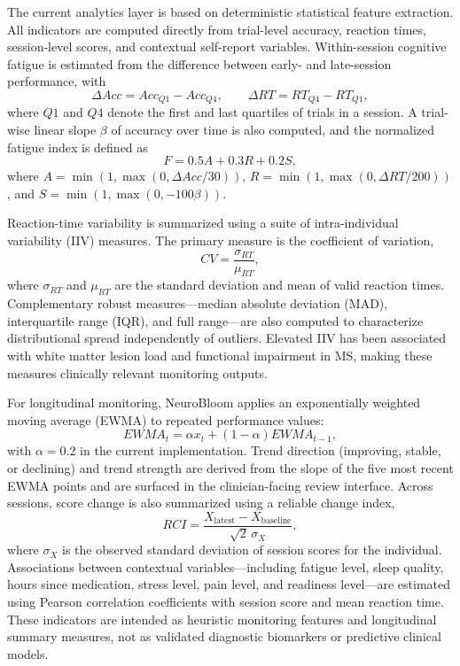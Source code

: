 \documentclass[preprint,12pt,a4paper]{elsarticle}
\begin{document}
The current analytics layer is based on deterministic statistical feature extraction. All indicators are computed directly from trial-level accuracy, reaction times, session-level scores, and contextual self-report variables. Within-session cognitive fatigue is estimated from the difference between early- and late-session performance, with
\begin{equation}
\Delta Acc = Acc_{Q1} - Acc_{Q4}, \qquad \Delta RT = RT_{Q4} - RT_{Q1},
\end{equation}
where $Q1$ and $Q4$ denote the first and last quartiles of trials in a session. A trial-wise linear slope $\beta$ of accuracy over time is also computed, and the normalized fatigue index is defined as
\begin{equation}
F = 0.5A + 0.3R + 0.2S,
\end{equation}
where $A=\min(1,\max(0,\Delta Acc/30))$, $R=\min(1,\max(0,\Delta RT/200))$, and $S=\min(1,\max(0,-100\beta))$.

Reaction-time variability is summarized using a suite of intra-individual variability (IIV) measures. The primary measure is the coefficient of variation,
\begin{equation}
CV = \frac{\sigma_{RT}}{\mu_{RT}},
\end{equation}
where $\sigma_{RT}$ and $\mu_{RT}$ are the standard deviation and mean of valid reaction times. Complementary robust measures---median absolute deviation (MAD), interquartile range (IQR), and full range---are also computed to characterize distributional spread independently of outliers. Elevated IIV has been associated with white matter lesion load and functional impairment in MS, making these measures clinically relevant monitoring outputs.

For longitudinal monitoring, NeuroBloom applies an exponentially weighted moving average (EWMA) to repeated performance values:
\begin{equation}
EWMA_t = \alpha x_t + (1-\alpha)EWMA_{t-1},
\end{equation}
with $\alpha=0.2$ in the current implementation. Trend direction (improving, stable, or declining) and trend strength are derived from the slope of the five most recent EWMA points and are surfaced in the clinician-facing review interface. Across sessions, score change is also summarized using a reliable change index,
\begin{equation}
RCI = \frac{X_{\mathrm{latest}} - X_{\mathrm{baseline}}}{\sqrt{2}\,\sigma_X},
\end{equation}
where $\sigma_X$ is the observed standard deviation of session scores for the individual. Associations between contextual variables---including fatigue level, sleep quality, hours since medication, stress level, pain level, and readiness level---are estimated using Pearson correlation coefficients with session score and mean reaction time. These indicators are intended as heuristic monitoring features and longitudinal summary measures, not as validated diagnostic biomarkers or predictive clinical models.
\end{document}
